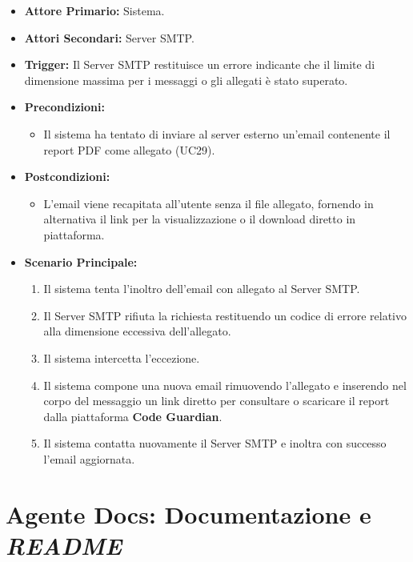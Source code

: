 \documentclass[12pt, a4paper]{article}
\begin{document}
\begin{itemize}
    \item \textbf{Attore Primario:} Sistema.
    \item \textbf{Attori Secondari:} Server SMTP.
    \item \textbf{Trigger:} Il Server SMTP restituisce un errore indicante che il limite di dimensione massima per i messaggi o gli allegati è stato superato.
    \item \textbf{Precondizioni:}
    \begin{itemize}
        \item Il sistema ha tentato di inviare al server esterno un'email contenente il report PDF come allegato (UC29).
    \end{itemize}
    \item \textbf{Postcondizioni:}
    \begin{itemize}
        \item L'email viene recapitata all'utente senza il file allegato, fornendo in alternativa il link per la visualizzazione o il download diretto in piattaforma.
    \end{itemize}
    \item \textbf{Scenario Principale:}
    \begin{enumerate}
        \item Il sistema tenta l'inoltro dell'email con allegato al Server SMTP.
        \item Il Server SMTP rifiuta la richiesta restituendo un codice di errore relativo alla dimensione eccessiva dell'allegato.
        \item Il sistema intercetta l'eccezione.
        \item Il sistema compone una nuova email rimuovendo l'allegato e inserendo nel corpo del messaggio un link diretto per consultare o scaricare il report dalla piattaforma \textbf{Code Guardian}.
        \item Il sistema contatta nuovamente il Server SMTP e inoltra con successo l'email aggiornata.
    \end{enumerate}
\end{itemize}

\newpage
\section{Agente Docs: Documentazione e \textit{README}}
\end{document}
